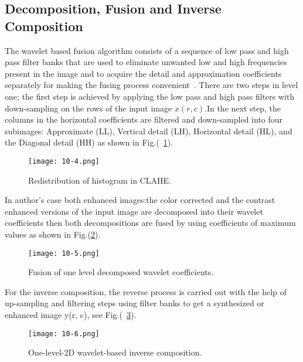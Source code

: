 \documentclass[10pt,twocolumn,letterpaper]{article}
\begin{document}
\subsection{Decomposition, Fusion and Inverse Composition}
The wavelet based fusion algorithm consists of a sequence of low pass and high pass filter banks that are used to eliminate unwanted low and high frequencies present in the image and to acquire the detail and approximation coefficients separately for making the fusing process convenient~\cite{Digital_2009_6}.
There are two steps in level one; the first step is achieved by applying the low pass and high pass filters with down-sampling on the rows of the input image $x(r, c)$.In the next step, the columns in the horizontal coefficients are filtered and down-sampled into four subimages: Approximate (LL), Vertical detail (LH),
Horizontal detail (HL), and the Diagonal detail (HH) as shown in Fig.(~\ref{fig:fourpicture}).
\begin{figure}[htb]
\centering
\texttt{[image: 10-4.png]}
\caption{Redistribution of histogram in CLAHE.}
\label{fig:fourpicture}
\end{figure}
In author's case both enhanced images:the color corrected and the
contrast enhanced versions of the input image are decomposed
into their wavelet coefficients then both decompositions are
fused by using coefficients of maximum values as shown in Fig.(\ref{fig:fivepicture}).
\begin{figure}[htb]
\centering
\texttt{[image: 10-5.png]}
\caption{Fusion of one level decomposed wavelet coefficients.}
\label{fig:fivepicture}
\end{figure}
For the inverse composition, the reverse
process is carried out with the help of up-sampling and filtering
steps using filter banks to get a synthesized or enhanced image
y(r, c), see Fig.(~\ref{fig:sixpicture}).
\begin{figure}[htb]
\centering
\texttt{[image: 10-6.png]}
\caption{One-level-2D wavelet-based inverse composition.}
\label{fig:sixpicture}
\end{figure}
{\small


}
\end{document}
